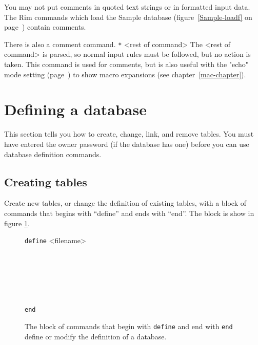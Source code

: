 \documentclass[11pt,a4paper]{report}
\begin{document}
You may not put comments in quoted text strings or in formatted
input data.
The Rim commands which load the Sample database
(figure~\ref{Sample-loadf} on page~\pageref{Sample-loadf})
contain comments.
 
There is also a comment command.
\verb!*! <rest of command>
The <rest of command> is parsed, so normal input rules must
be followed, but no action is taken.  This command is 
used for comments, but is also useful with the "echo" mode
setting (page~\pageref{echo-mode}) to show macro expansions
(see chapter~\ref{mac-chapter}).
 
\section{Defining a database}
\label{ocmd-section}
This section tells you how to create, change, link, and
remove tables.
You must have entered the owner password
(if the database has one) before you can use
database definition commands.
 
\subsection{Creating tables}
Create new tables, or change the definition of
existing tables, with a block of commands that begins with
``define'' and ends with ``end''.  The block is show
in figure \ref{define}.
 
\begin{figure}[htp]
  \verb!define! <filename> \\
   \\
   \\
   \\
   \\
   \\
   \\
   \verb!end!
\caption[Table definition block]
 {The block of commands that begin with {\tt define} and end with
 {\tt end} define or modify the definition of a database.}
\label{define}
\end{figure}
 
\end{document}
